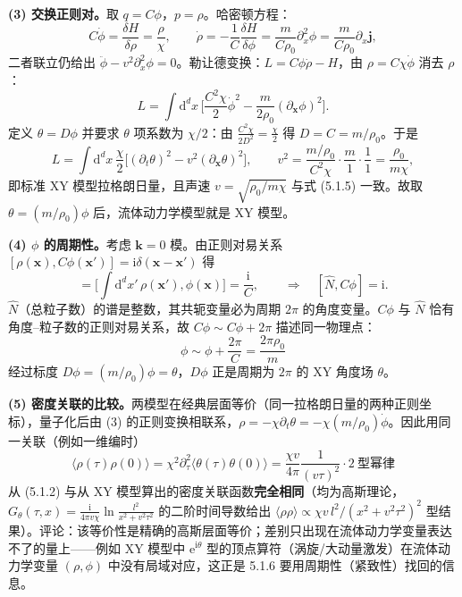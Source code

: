 \textbf{(3) 交换正则对。}取 $q=C\phi$，$p=\rho$。哈密顿方程：
\begin{equation*}
C\dot\phi=\frac{\delta H}{\delta\rho}=\frac{\rho}{\chi},\qquad
\dot\rho=-\frac1C\frac{\delta H}{\delta\phi}=\frac{m}{C\rho_0}\partial_x^{2}\phi=\frac{m}{C\rho_0}\partial_x\pmb{j},
\end{equation*}
二者联立仍给出 $\ddot\phi-v^{2}\partial_x^{2}\phi=0$。勒让德变换：$L=C\phi\dot\rho-H$，由 $\rho=C\chi\dot\phi$ 消去 $\rho$：
\begin{equation*}
L=\int\mathrm{d}^dx\,\Big[\frac{C^{2}\chi}{2}\dot\phi^{2}-\frac{m}{2\rho_0}(\partial_{\pmb{x}}\phi)^{2}\Big].
\end{equation*}
定义 $\theta=D\phi$ 并要求 $\theta$ 项系数为 $\chi/2$：由 $\frac{C^{2}\chi}{2D^{2}}=\frac{\chi}{2}$ 得 $D=C=m/\rho_0$。于是
\begin{equation*}
L=\int\mathrm{d}^dx\,\frac{\chi}{2}\Big[(\partial_t\theta)^{2}-v^{2}(\partial_{\pmb{x}}\theta)^{2}\Big],
\qquad v^{2}=\frac{m/\rho_0}{C^{2}\chi}\cdot\frac{m}{1}\cdot\frac{1}{1}=\frac{\rho_0}{m\chi},
\end{equation*}
即标准 XY 模型拉格朗日量，且声速 $v=\sqrt{\rho_0/m\chi}$ 与式 (5.1.5) 一致。故取 $\theta=(m/\rho_0)\phi$ 后，流体动力学模型就是 XY 模型。

\textbf{(4) $\phi$ 的周期性。}考虑 $\pmb{k}=0$ 模。由正则对易关系 $[\rho(\pmb{x}),C\phi(\pmb{x}')]=\mathrm{i}\delta(\pmb{x}-\pmb{x}')$ 得
\begin{equation*}
[\hat N,\phi(\pmb{x})]=\Big[\!\int\mathrm{d}^dx'\,\rho(\pmb{x}'),\phi(\pmb{x})\Big]=\frac{\mathrm{i}}{C},
\qquad\Longrightarrow\quad [\hat N,C\phi]=\mathrm{i}.
\end{equation*}
$\hat N$（总粒子数）的谱是整数，其共轭变量必为周期 $2\pi$ 的角度变量。$C\phi$ 与 $\hat N$ 恰有角度--粒子数的正则对易关系，故 $C\phi\sim C\phi+2\pi$ 描述同一物理点：
\begin{equation*}
\boxed{\;\phi\sim\phi+\frac{2\pi}{C}=\frac{2\pi\rho_0}{m}\;}
\end{equation*}
经过标度 $D\phi=(m/\rho_0)\phi=\theta$，$D\phi$ 正是周期为 $2\pi$ 的 XY 角度场 $\theta$。

\textbf{(5) 密度关联的比较。}两模型在经典层面等价（同一拉格朗日量的两种正则坐标），量子化后由 (3) 的正则变换相联系，$\rho=-\chi\partial_t\theta=-\chi(m/\rho_0)\dot\phi$。因此用同一关联（例如一维编时）
\begin{equation*}
\langle\rho(\tau)\rho(0)\rangle=\chi^{2}\partial_\tau^{2}\langle\theta(\tau)\theta(0)\rangle
=\frac{\chi v}{4\pi}\frac{1}{(v\tau)^{2}}\cdot 2\ \text{型幂律}
\end{equation*}
从 (5.1.2) 与从 XY 模型算出的密度关联函数\textbf{完全相同}（均为高斯理论，$G_\theta(\tau,x)=\frac{\mathrm{i}}{4\pi v\chi}\ln\frac{l^{2}}{x^{2}+v^{2}\tau^{2}}$ 的二阶时间导数给出 $\langle\rho\rho\rangle\propto\chi v\,l^{2}/(x^{2}+v^{2}\tau^{2})^{2}$ 型结果）。评论：该等价性是精确的高斯层面等价；差别只出现在流体动力学变量表达不了的量上——例如 XY 模型中 $\mathrm{e}^{\mathrm{i}\theta}$ 型的顶点算符（涡旋/大动量激发）在流体动力学变量 $(\rho,\phi)$ 中没有局域对应，这正是 5.1.6 要用周期性（紧致性）找回的信息。

